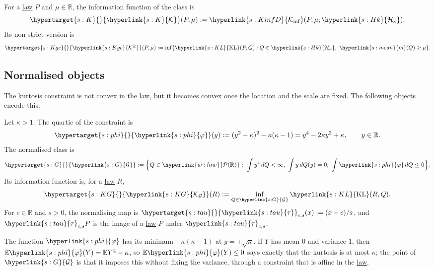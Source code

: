 \documentclass[11pt]{article}
\newcommand{\E}{\mathbb{E}}
\newcommand{\R}{\mathbb{R}}
\newcommand{\Pspace}{\term{w:law}{\mathcal{P}(\mathbb{R})}}
\newcommand{\dt}[1]{\hypertarget{#1}{}}
\newcommand{\sy}[2]{{\hyperlink{#1}{#2}}}
\newcommand{\term}[2]{\hyperlink{#1}{#2}}
\newcommand{\mean}{\sy{s:mean}{m}}
\newcommand{\KL}{\sy{s:KL}{\mathrm{KL}}}
\newcommand{\Kinf}{\sy{s:KinfD}{\mathcal{K}_{\inf}}}
\newcommand{\Hk}{\sy{s:Hk}{\mathcal{H}_{\kappa}}}
\newcommand{\Kc}{\sy{s:K}{\mathcal{K}}}
\newcommand{\Kge}{\sy{s:Kge}{\mathcal{K}^{\ge}}}
\newcommand{\phik}{\sy{s:phi}{\varphi}}
\newcommand{\Gk}{\sy{s:G}{\mathcal{G}}}
\newcommand{\KG}{\sy{s:KG}{\mathcal{K}_{\mathcal{G}}}}
\newcommand{\tauc}{\sy{s:tau}{\tau}}
\begin{document}
\begin{definition}\label{def:kinf}
For a \term{w:law}{law} $P$ and $\mu\in\R$, the information function of the class is
\begin{equation*}
  \dt{s:K}\Kc(P,\mu):=\Kinf(P,\mu;\Hk).
\end{equation*}
Its non-strict version is
\begin{equation*}
  \dt{s:Kge}\Kge(P,\mu):=\inf\{\KL(P,Q):Q\in\Hk,\ \mean(Q)\ge\mu\}.
\end{equation*}
\end{definition}

\subsection{Normalised objects}

The kurtosis constraint is not convex in the \term{w:law}{law}, but it becomes convex once the location and
the scale are fixed. The following objects encode this.

\begin{definition}\label{def:normalised}
Let $\kappa>1$. The quartic of the constraint is
\begin{equation*}
  \dt{s:phi}\phik(y):=(y^2-\kappa)^2-\kappa(\kappa-1)=y^4-2\kappa y^2+\kappa,\qquad y\in\R.
\end{equation*}
The normalised class is
\begin{equation*}
  \dt{s:G}\Gk:=\Bigl\{Q\in\Pspace:\ \int y^4\,dQ<\infty,\ \int y\,dQ(y)=0,\ \int\phik\,dQ\le0\Bigr\}.
\end{equation*}
Its information function is, for a \term{w:law}{law} $R$,
\begin{equation*}
  \dt{s:KG}\KG(R):=\inf_{Q\in\Gk}\KL(R,Q).
\end{equation*}
For $c\in\R$ and $s>0$, the normalising map is $\dt{s:tau}\tauc_{c,s}(x):=(x-c)/s$, and $\tauc_{c,s}P$ is the
image of a \term{w:law}{law} $P$ under $\tauc_{c,s}$.
\end{definition}

The function $\phik$ has its minimum $-\kappa(\kappa-1)$ at $y=\pm\sqrt\kappa$. If $Y$ has mean $0$ and variance
$1$, then $\E\phik(Y)=\E Y^4-\kappa$, so $\E\phik(Y)\le0$ says exactly that the kurtosis is at most $\kappa$; the
point of $\Gk$ is that it imposes this without fixing the variance, through a constraint that is affine
in the \term{w:law}{law}.
\end{document}
